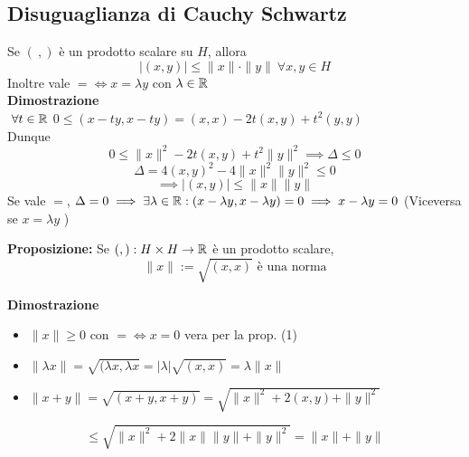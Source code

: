 \subsection{Disuguaglianza di Cauchy Schwartz}
Se $(\ ,)$ è un prodotto scalare su $H$, allora
\[|(x,y)|\le \|x\|\cdot \|y\|\ \forall x,y\in H\]
Inoltre vale $=\iff x=\lambda y$ con $\lambda \in \mathbb{R}$
\\\textbf{Dimostrazione} 
\\$\ \forall t\in \mathbb{R}$ $0\le (x-ty,x-ty)=(x,x)-2t(x,y)+t^2(y,y)$
\\Dunque
\[0\le \|x\|^2-2t(x,y)+t^2\|y\|^2\implies \Delta\le 0\]
\[\Delta = 4(x,y)^2-4\|x\|^2\|y\|^2\le 0\]
\[\implies |(x,y)|\le \|x\|\|y\|\]
Se vale $=$, $\Delta = 0\implies \exists \lambda\in \mathbb{R}:(x-\lambda y,x-\lambda y)=0\implies x-\lambda y=0$
(Viceversa se $x=\lambda y$ )
\begin{tcolorbox}
	\textbf{Proposizione:} Se $(,):H\times H\to \mathbb{R}$ è un prodotto scalare,
	\[\|x\|:=\sqrt{(x,x)} \text{ è una norma}\]

\end{tcolorbox}
\textbf{Dimostrazione} 
\begin{itemize}
	\item $\|x\|\ge 0$ con $=\iff x=0$ vera per la prop. (1)
	\item $\|\lambda x\|=\sqrt{(\lambda x,\lambda x} =|\lambda|\sqrt{(x,x)} =\lambda \|x\|$
	\item $\|x+y\|=\sqrt{(x+y,x+y)} =\sqrt{\|x\|^2+2(x,y)+\|y\|^2} $
\end{itemize}
\[\le \sqrt{\|x\|^2+2\|x\| \|y\|+\|y\|^2} =\|x\|+\|y\|\]
